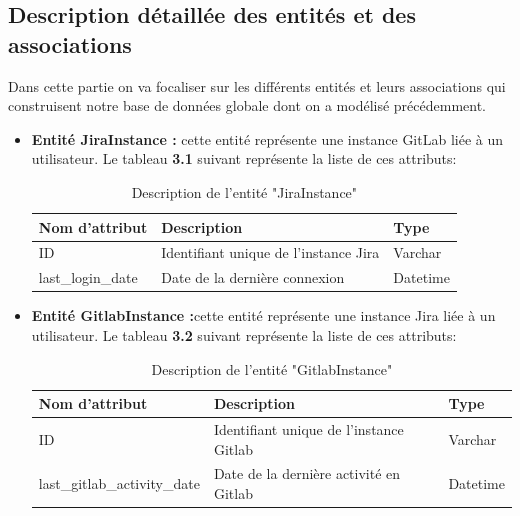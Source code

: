     \subsection{Description détaillée des entités et des associations}
    Dans cette partie on va focaliser sur les différents entités et leurs associations qui construisent notre base de données globale dont on a modélisé précédemment.
    \begin{itemize}
        \item \textbf{Entité JiraInstance :} cette entité représente une instance GitLab liée à un utilisateur.
        Le tableau \textbf{3.1} suivant représente la liste de ces attributs: 

            \begin{center}   
                \begin{longtable}{|p{3cm}|p{11cm}|p{2cm}|}
                    \caption {Description de l'entité "JiraInstance"} \\
                    \hline
                    \rowcolor{blue!18}\textbf{\large{Nom d'attribut}} & \textbf{\large{Description}} & \textbf{\large{Type}} \\
                    \hline
                    ID&  Identifiant unique de l'instance Jira&  Varchar\\\hline
                    last\_login\_date& Date de la dernière connexion& Datetime\\\hline

                \end{longtable}
                

            \end{center}
            \vspace{-1cm}
        \item \textbf{Entité GitlabInstance :}cette entité représente une instance Jira liée à un utilisateur.
        Le tableau \textbf{3.2} suivant représente la liste de ces attributs: 
        \begin{center}   
                \begin{longtable}{|p{5cm}|p{9cm}|p{2cm}|}
                    \caption {Description de l'entité "GitlabInstance"} \\
                    \hline
                    \rowcolor{blue!18}\textbf{\large{Nom d'attribut}} & \textbf{\large{Description}} & \textbf{\large{Type}} \\
                    \hline
                    ID&  Identifiant unique de l'instance Gitlab&  Varchar\\\hline
                    last\_gitlab\_activity\_date& Date de la dernière activité en Gitlab& Datetime\\\hline


\end{longtable}
\end{center}
\end{itemize}
